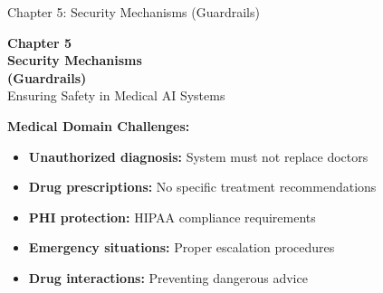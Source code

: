 
\begin{frame}{Chapter 5: Security Mechanisms (Guardrails)}
    \begin{center}
        \Large{\textbf{Chapter 5}}\\
        \vspace{0.5em}
        \huge{\textbf{Security Mechanisms}}\\
        \huge{\textbf{(Guardrails)}}\\
        \vspace{0.5em}
        \large{Ensuring Safety in Medical AI Systems}
    \end{center}
    
    \vspace{0.5em}
    
    \textbf{Medical Domain Challenges:}
    \begin{itemize}
        \item \textbf{Unauthorized diagnosis:} System must not replace doctors
        \item \textbf{Drug prescriptions:} No specific treatment recommendations
        \item \textbf{PHI protection:} HIPAA compliance requirements
        \item \textbf{Emergency situations:} Proper escalation procedures
        \item \textbf{Drug interactions:} Preventing dangerous advice
    \end{itemize}
\end{frame}

